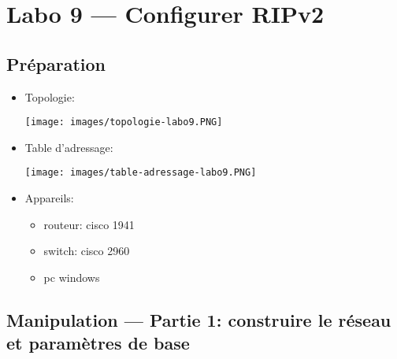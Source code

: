 \documentclass[a4paper]{article}
\begin{document}
\section{Labo 9 --- Configurer RIPv2}










\subsection{Préparation}





\begin{itemize}



\item Topologie:
\begin{center}
    \texttt{[image: images/topologie-labo9.PNG]}
\end{center}



\item Table d'adressage:
\begin{center}
    \texttt{[image: images/table-adressage-labo9.PNG]}
\end{center}



\item Appareils:
\begin{itemize}
    \item routeur: cisco 1941
    \item switch: cisco 2960
    \item pc windows
\end{itemize}



\end{itemize}










\subsection{Manipulation --- Partie 1: construire le réseau et paramètres de base}
\end{document}

